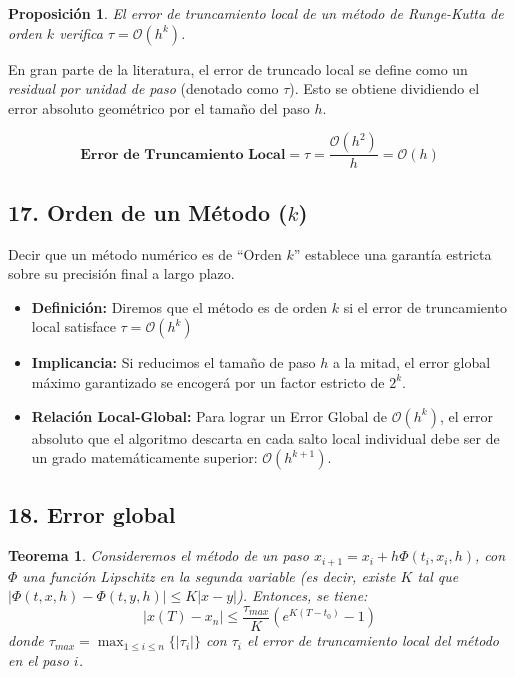 \documentclass[12pt]{article}
\newtheorem{teorema}{Teorema}
\newtheorem{proposicion}{Proposición}
\begin{document}
\begin{proposicion}
El error de truncamiento local de un método de Runge-Kutta de orden $k$ verifica $\tau = \mathcal{O}(h^k)$.
\end{proposicion}

En gran parte de la literatura, el error de truncado local se define como un \textit{residual por unidad de paso} (denotado como $\tau$). Esto se obtiene dividiendo el error absoluto geométrico por el tamaño del paso $h$.


$$\textbf{Error de Truncamiento Local} = \tau = \frac{\mathcal{O}(h^2)}{h} = \mathcal{O}(h) $$

\subsection*{17. Orden de un Método ($k$)}
Decir que un método numérico es de ``Orden $k$'' establece una garantía estricta sobre su precisión final a largo plazo. 
\begin{itemize}
    \item \textbf{Definición:} Diremos que el método es de orden $k$ si el error de truncamiento local satisface $\tau = \mathcal{O}(h^k)$
    \item \textbf{Implicancia:} Si reducimos el tamaño de paso $h$ a la mitad, el error global máximo garantizado se encogerá por un factor estricto de $2^k$.
    \item \textbf{Relación Local-Global:} Para lograr un Error Global de $\mathcal{O}(h^k)$, el error absoluto que el algoritmo descarta en cada salto local individual debe ser de un grado matemáticamente superior: $\mathcal{O}(h^{k+1})$.
\end{itemize}

\subsection*{18. Error global}
\begin{teorema}
Consideremos el método de un paso $x_{i+1} = x_i + h\Phi(t_i, x_i, h)$, con $\Phi$ una función Lipschitz en la segunda variable (es decir, existe $K$ tal que $|\Phi(t, x, h) - \Phi(t, y, h)| \le K|x - y|$). Entonces, se tiene:
\begin{equation}
    |x(T) - x_n| \le \frac{\tau_{max}}{K} \left(e^{K(T - t_0)} - 1\right)
\end{equation}
donde $\tau_{max} = \max_{1 \le i \le n} \{|\tau_i|\}$ con $\tau_i$ el error de truncamiento local del método en el paso $i$.
\end{teorema}
\end{document}
